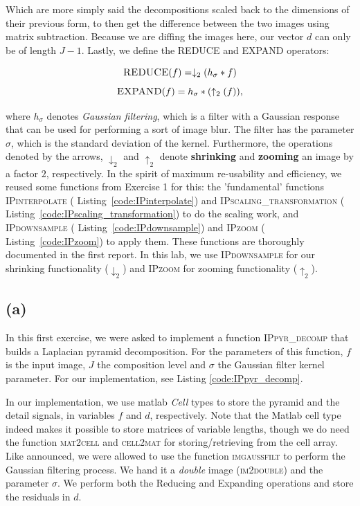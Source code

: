 \documentclass{article}
\begin{document}
Which are more simply said the decompositions scaled back to the dimensions of their previous form, to then get the difference between the two images using matrix subtraction. Because we are diffing the images here, our vector $d$ can only be of length $J-1$. Lastly, we define the \textsc{REDUCE} and \textsc{EXPAND} operators:

\[
    \textsc{REDUCE}(f) = \downarrow_2 (h_\sigma * f)
\]
\[
    \textsc{EXPAND}(f) = h_\sigma * (\uparrow_2 (f)),
\]

where $h_\sigma$ denotes \textit{Gaussian filtering}, which is a filter with a Gaussian response that can be used for performing a sort of image blur. The filter has the parameter $\sigma$, which is the standard deviation of the kernel. Furthermore, the operations denoted by the arrows, $\downarrow_2$ and $\uparrow_2$ denote \textbf{shrinking} and \textbf{zooming} an image by a factor $2$, respectively. In the spirit of maximum re-usability and efficiency, we reused some functions from Exercise 1 for this: the 'fundamental' functions \textsc{IPinterpolate} ( Listing~\ref{code:IPinterpolate}) and \textsc{IPscaling\_transformation} ( Listing~\ref{code:IPscaling_transformation}) to do the scaling work, and \textsc{IPdownsample} ( Listing~\ref{code:IPdownsample}) and \textsc{IPzoom} ( Listing~\ref{code:IPzoom}) to apply them. These functions are thoroughly documented in the first report. In this lab, we use \textsc{IPdownsample} for our shrinking functionality ($\downarrow_2$) and \textsc{IPzoom} for zooming functionality ($\uparrow_2$).

\subsection*{(a)} In this first exercise, we were asked to implement a function \textsc{IPpyr\_decomp} that builds a Laplacian pyramid decomposition. For the parameters of this function, $f$ is the input image, $J$ the composition level and $\sigma$ the Gaussian filter kernel parameter. For our implementation, see  Listing \ref{code:IPpyr_decomp}.

In our implementation, we use matlab \textit{Cell} types to store the pyramid and the detail signals, in variables $f$ and $d$, respectively. Note that the Matlab cell type indeed makes it possible to store matrices of variable lengths, though we do need the function \textsc{mat2cell} and \textsc{cell2mat} for storing/retrieving from the cell array. Like announced, we were allowed to use the function \textsc{imgaussfilt} to perform the Gaussian filtering process. We hand it a \textit{double} image (\textsc{im2double}) and the parameter $\sigma$. We perform both the Reducing and Expanding operations and store the residuals in $d$.
\end{document}
